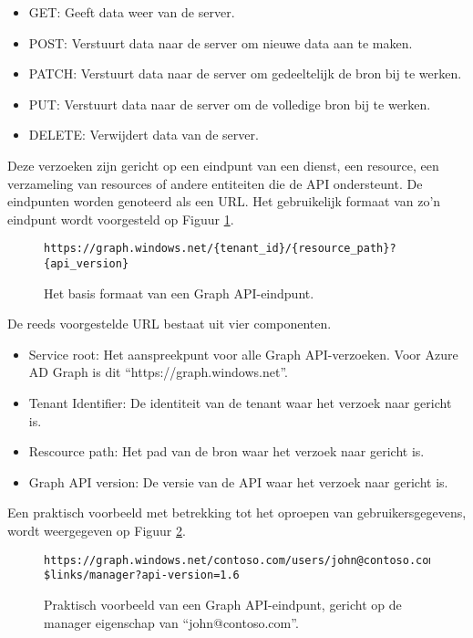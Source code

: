 \begin{itemize}
    \item GET: Geeft data weer van de server.
    \item POST: Verstuurt data naar de server om nieuwe data aan te maken.
    \item PATCH: Verstuurt data naar de server om gedeeltelijk de bron bij te werken.
    \item PUT: Verstuurt data naar de server om de volledige bron bij te werken.
    \item DELETE: Verwijdert data van de server.
\end{itemize}

Deze verzoeken zijn gericht op een eindpunt van een dienst, een resource, een verzameling van resources of andere entiteiten die de \ac{API} ondersteunt. De eindpunten worden genoteerd als een \ac{URL}. Het gebruikelijk formaat van zo'n eindpunt wordt voorgesteld op Figuur \ref{bfe}. \\

\begin{figure}[h]
    \footnotesize\begin{verbatim}https://graph.windows.net/{tenant_id}/{resource_path}?{api_version}
    \end{verbatim}    
    \caption[Basis formaat Graph API-eindpunt]{Het basis formaat van een Graph \ac{API}-eindpunt.}
    \label{bfe}
\end{figure}

De reeds voorgestelde \ac{URL} bestaat uit vier componenten.

\begin{itemize}
    \item Service root: Het aanspreekpunt voor alle Graph \ac{API}-verzoeken. Voor Azure \ac{AD} Graph is dit “https://graph.windows.net”.
    \item Tenant Identifier: De identiteit van de tenant waar het verzoek naar gericht is.
    \item Rescource path: Het pad van de bron waar het verzoek naar gericht is.
    \item Graph \ac{API} version: De versie van de \ac{API} waar het verzoek naar gericht is.
\end{itemize}

Een praktisch voorbeeld met betrekking tot het oproepen van gebruikersgegevens, wordt weergegeven op Figuur \ref{pfe}. \\

\begin{figure}[h]
    \footnotesize\begin{verbatim}https://graph.windows.net/contoso.com/users/john@contoso.com/
$links/manager?api-version=1.6
    \end{verbatim}    
    \caption[Voorbeeld Graph API-eindpunt]{Praktisch voorbeeld van een Graph \ac{API}-eindpunt, gericht op de manager eigenschap van “john@contoso.com”.}
    \label{pfe}
\end{figure}



